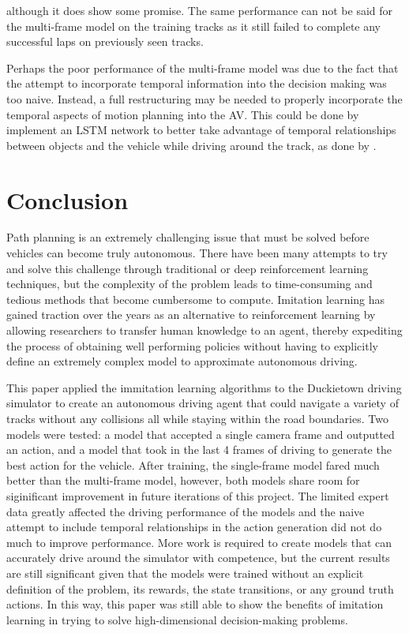\documentclass[conference]{IEEEtran}
\begin{document}
although it does show some promise. The same performance can not be said for the multi-frame model
on the training tracks as it still failed to complete any successful laps on previously seen tracks.
\par 
Perhaps the poor performance of the multi-frame model was due to the fact that the attempt to incorporate
temporal information into the decision making was too naive. Instead, a full restructuring may be needed
to properly incorporate the temporal aspects of motion planning into the AV. 
This could be done by implement an LSTM network to better take advantage of temporal relationships 
between objects and the vehicle while driving around the track, as done by \citet{lstm}. 


\section{Conclusion}
\label{sec:conclusion}
Path planning is an extremely challenging issue that must be solved before vehicles can become
truly autonomous. There have been many attempts to try and solve this challenge through traditional
or deep reinforcement learning techniques, but the complexity of the problem leads to time-consuming 
and tedious methods that become cumbersome to compute. Imitation learning has gained traction over the years
as an alternative to reinforcement learning by allowing researchers to transfer human knowledge
to an agent, thereby expediting the process of obtaining well performing policies without having 
to explicitly define an extremely complex model to approximate autonomous driving. \par 
This paper applied the immitation learning algorithms to the Duckietown driving simulator 
to create an autonomous driving agent that could navigate a variety of tracks without 
any collisions all while staying within the road boundaries. Two models were tested: a model
that accepted a single camera frame and outputted an action, and a model that took in the last 
4 frames of driving to generate the best action for the vehicle. After training, the single-frame 
model fared much better than the multi-frame model, however, both models share room for 
siginificant improvement in future iterations of this project. The limited expert data greatly 
affected the driving performance of the models and the naive attempt to include temporal relationships 
in the action generation did not do much to improve performance. More work is required to 
create models that can accurately drive around the simulator with competence, but the current 
results are still significant given that the models were trained without an explicit definition 
of the problem, its rewards, the state transitions, or any ground truth actions. In this way, this 
paper was still able to show the benefits of imitation learning in trying to solve high-dimensional 
decision-making problems.




\end{document}
